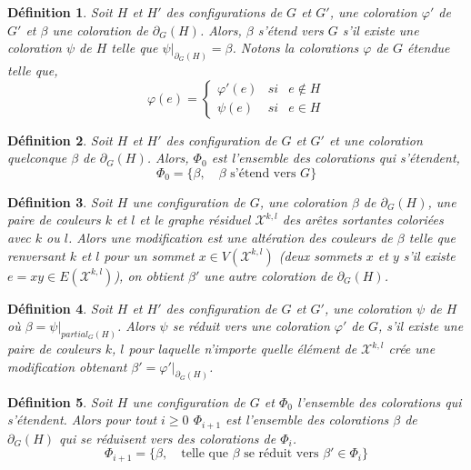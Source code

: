 \documentclass[10pt,a4paper]{article}
\newtheorem{definition}{Définition}
\begin{document}
\begin{definition}
Soit $H$ et $H'$ des configurations de $G$ et $G'$, une coloration $\varphi'$ de $G'$ et $\beta$ une coloration de $\partial_G(H)$. Alors, $\beta$ \emph{s'étend} vers $G$ s'il existe une coloration $\psi$ de $H$ telle que $\psi|_{\partial_G(H)} = \beta$. Notons la colorations $\varphi$ de $G$ étendue telle que,
$$
\varphi(e) = \left\{ \begin{array}{lcc}
\varphi'(e) & si & e \not\in H \\
\psi(e) & si & e \in H 
\end{array}
\right.
$$
\end{definition}

\begin{definition}
Soit $H$ et $H'$ des configuration de $G$ et $G'$ et une coloration quelconque $\beta$ de $\partial_G(H)$. Alors, $\Phi_0$ est l'ensemble des colorations qui s'étendent,
$$
\Phi_0 = \{\beta, \quad \beta \textrm{ s'étend  vers }G\}
$$
\end{definition}

\begin{definition}
Soit $H$ une configuration de $G$, une coloration $\beta$ de $\partial_G(H)$, une paire de couleurs $k$ et $l$ et le graphe résiduel $\mathcal{X}^{k,l}$ des arêtes sortantes coloriées avec $k$ ou $l$. Alors une \emph{modification} est une altération des couleurs de $\beta$ telle que renversant $k$ et $l$ pour un sommet $x\in V(\mathcal{X}^{k,l})$ (deux sommets $x$ et $y$ s'il existe $e=xy \in E(\mathcal{X}^{k,l})$), on obtient $\beta'$ une autre coloration de $\partial_G(H)$.
\label{de:mod}
\end{definition}

\begin{definition}
Soit $H$ et $H'$ des configuration de $G$ et $G'$, une coloration $\psi$ de $H$ où  $\beta = \psi|_{partial_G(H)}$. Alors $\psi$ \emph{se réduit} vers une coloration $\varphi'$ de $G$, s'il existe une paire de couleurs $k$, $l$ pour laquelle n'importe quelle élément de $\mathcal{X}^{k,l}$ crée une modification obtenant $\beta' = \varphi'|_{\partial_G(H)}$.
\label{de:sered}
\end{definition}

\begin{definition}
Soit $H$ une configuration de $G$ et $\Phi_0$ l'ensemble des colorations qui s'étendent. Alors pour tout $i \geq 0$ $\Phi_{i+1}$ est l'ensemble des colorations $\beta$ de $\partial_G(H)$ qui se réduisent vers des colorations de $\Phi_i$.
$$
\Phi_{i+1}= \{ \beta, \quad \textrm{telle que $\beta$ se réduit vers } \beta' \in \Phi_i\}
$$
\end{definition}
\end{document}
